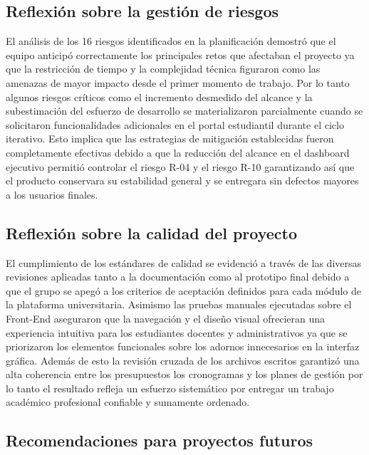 \documentclass[11pt,spanish]{article}
\begin{document}
\subsection{Reflexión sobre la gestión de riesgos}

El análisis de los 16 riesgos identificados en la planificación demostró que el equipo anticipó correctamente los principales retos que afectaban el proyecto ya que la restricción de tiempo y la complejidad técnica figuraron como las amenazas de mayor impacto desde el primer momento de trabajo. Por lo tanto algunos riesgos críticos como el incremento desmedido del alcance y la subestimación del esfuerzo de desarrollo se materializaron parcialmente cuando se solicitaron funcionalidades adicionales en el portal estudiantil durante el ciclo iterativo. Esto implica que las estrategias de mitigación establecidas fueron completamente efectivas debido a que la reducción del alcance en el dashboard ejecutivo permitió controlar el riesgo R-04 y el riesgo R-10 garantizando así que el producto conservara su estabilidad general y se entregara sin defectos mayores a los usuarios finales.

\subsection{Reflexión sobre la calidad del proyecto}

El cumplimiento de los estándares de calidad se evidenció a través de las diversas revisiones aplicadas tanto a la documentación como al prototipo final debido a que el grupo se apegó a los criterios de aceptación definidos para cada módulo de la plataforma universitaria. Asimismo las pruebas manuales ejecutadas sobre el Front-End aseguraron que la navegación y el diseño visual ofrecieran una experiencia intuitiva para los estudiantes docentes y administrativos ya que se priorizaron los elementos funcionales sobre los adornos innecesarios en la interfaz gráfica. Además de esto la revisión cruzada de los archivos escritos garantizó una alta coherencia entre los presupuestos los cronogramas y los planes de gestión por lo tanto el resultado refleja un esfuerzo sistemático por entregar un trabajo académico profesional confiable y sumamente ordenado.

\subsection{Recomendaciones para proyectos futuros}
\end{document}
